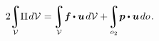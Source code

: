 \nopagebreak\vspace{-0.1em}\begin{equation}\label{clapeyron:elasticitytheorem}
2 \hspace{-0.2em}
\integral\displaylimits_{\mathcal{V}} \hspace{-0.5ex} \potential \hspace{.2ex} d\mathcal{V} \hspace{.12ex}
= \hspace{-0.2ex}
\integral\displaylimits_{\mathcal{V}} \hspace{-0.4ex} \bm{f} \hspace{-0.1ex} \dotp \bm{u} \hspace{.25ex} d\mathcal{V}
+ \hspace{-0.3ex}
\integral\displaylimits_{o_2} \hspace{-0.4ex} \bm{p} \dotp \bm{u} \hspace{.25ex} do
\hspace{.2ex} .
\end{equation}

